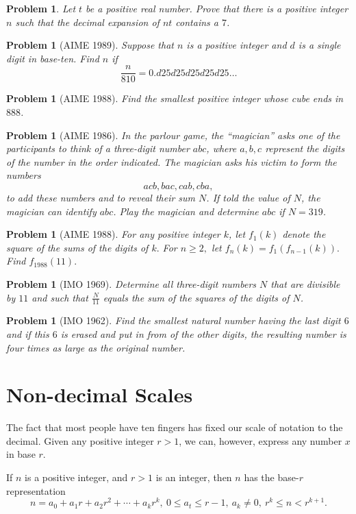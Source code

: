 \documentclass[11pt, openany]{book}
\theoremstyle{change} \theoremheaderfont{\blue\sffamily\bfseries}
\newtheorem{pro}[thm]{Problem}
\theoremstyle{nonumberplain} \theoremheaderfont{\sffamily\bfseries}
\newcommand{\dis}{\displaystyle}
\newcommand{\í}{\'{\i}}
\begin{document}
\begin{multicols}{2}
\begin{pro} Let $t$ be a positive real number. Prove that there is a positive integer $n$ such that
the decimal expansion of $nt$ contains a $7$.
\end{pro}
\begin{pro}[AIME 1989] Suppose that $n$ is a positive integer and $d$ is a single
digit in base-ten. Find $n$ if
$$\frac{n}{810} = 0.d25d25d25d25d25\ldots$$
\end{pro}
\begin{pro}[AIME 1988] Find the smallest positive integer whose cube ends in
$888$.
\end{pro}
\begin{pro}[AIME 1986] In the parlour game, the ``magician'' asks one of the
participants to think of a three-digit number $abc$, where $a, b,
c$ represent the digits of the number in the order indicated. The
magician asks his victim to form the numbers
$$acb, bac, cab, cba,$$to add these numbers and to reveal their sum $N$. If told the value of $N$, the
magician can identify $abc$. Play the magician and determine $abc$
if $N = 319$.
\end{pro}
\begin{pro}[AIME 1988] For any positive integer $k$, let $f_1(k)$ denote the square
of the sums of the digits of $k.$ For $n \geq 2,$ let $f_n(k) =
f_1(f_{n - 1}(k)).$ Find $f_{1988}(11).$
\end{pro}
\begin{pro}[IMO 1969] Determine all three-digit numbers $N$ that are divisible
by $11$ and such that $\dis{\frac{N}{11}}$ equals the sum of the
squares of the digits of $N$.
\end{pro}
\begin{pro}[IMO 1962] Find the smallest natural number having the last digit $6$
and if this $6$ is erased and put in from of the other digits, the
resulting number is four times as large as the original number.
\end{pro}
\end{multicols}
\section{Non-decimal Scales} The fact that most
people have ten fingers has fixed our scale of notation to the
decimal. Given any positive integer $r > 1$, we can, however,
express any number  $x$ in base $r$.



If $n$ is a positive integer, and $r > 1$ is an integer, then $n$
has the base-$r$ representation
$$n = a_0 + a_1r + a_2r^2 + \cdots + a_kr^k, \ 0 \leq a_t \leq r - 1, \ a_k \neq 0, \ r^k \leq n < r^{k + 1}.$$
\end{document}
